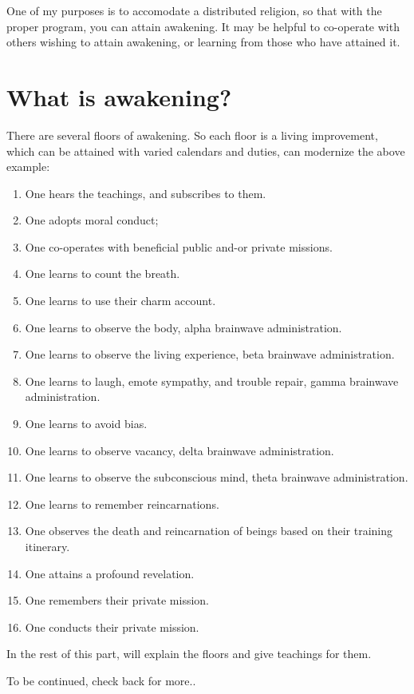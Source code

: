 One of my purposes is to accomodate a distributed religion, 
so that with the proper program, you can attain awakening.
It may be helpful to co-operate with others wishing to attain awakening,
or learning from those who have attained it.

\chapter{What is awakening?}
There are several floors of awakening. So each floor is a living improvement,
which can be attained with varied calendars and duties,
can modernize the above example:
\begin{enumerate}
  \item  One hears the teachings, and subscribes to them.
  \item  One adopts moral conduct;
  \item  One co-operates with beneficial public and-or private missions.
  \item  One learns to count the breath.
  \item  One learns to use their charm account.
  \item  One learns to observe the body, alpha brainwave administration.
  \item  One learns to observe the living experience, beta brainwave
administration.
  \item  One learns to laugh, emote sympathy, and trouble repair, gamma
brainwave administration.
  \item  One learns to avoid bias.
  \item  One learns to observe vacancy, delta brainwave administration.
  \item  One learns to observe the subconscious mind, theta brainwave
administration.
  \item  One learns to remember reincarnations.
  \item  One observes the death and reincarnation of beings based on their
training itinerary.
  \item  One attains a profound revelation.
  \item  One remembers their private mission.
  \item  One conducts their private mission.
\end{enumerate}

In the rest of this part, will explain the floors and give teachings for them.

To be continued, check back for more..
